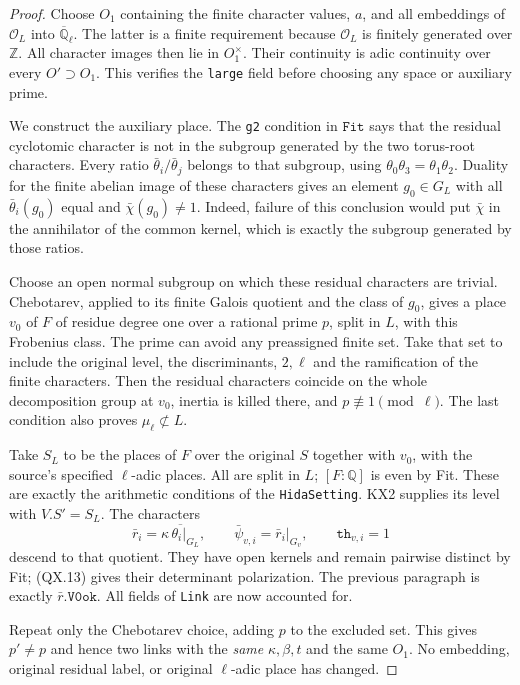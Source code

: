 \begin{proof}
Choose $O_1$ containing the finite character values, $a$, and
all embeddings of $\mathcal O_L$ into
$\overline{\mathbb Q}_\ell$.  The latter is a finite requirement
because $\mathcal O_L$ is finitely generated over $\mathbb Z$.
All character images then lie in $O_1^\times$.  Their
continuity is adic continuity over every $O'\supset O_1$.
This verifies the \texttt{large} field before choosing any
space or auxiliary prime.

We construct the auxiliary place.  The \texttt{g2} condition
in $\texttt{Fit}$ says that the residual cyclotomic character
is not in the subgroup generated by the two torus-root
characters.  Every ratio $\bar\theta_i/\bar\theta_j$ belongs
to that subgroup, using
$\theta_0\theta_3=\theta_1\theta_2$.
Duality for the finite abelian image of these characters gives
an element $g_0\in G_L$ with all $\bar\theta_i(g_0)$ equal
and $\bar\chi(g_0)\ne1$.  Indeed, failure of this conclusion
would put $\bar\chi$ in the annihilator of the common kernel,
which is exactly the subgroup generated by those ratios.

Choose an open normal subgroup on which these residual
characters are trivial.  Chebotarev, applied to its finite
Galois quotient and the class of $g_0$, gives a place $v_0$
of $F$ of residue degree one over a rational prime $p$,
split in $L$, with this Frobenius class.  The prime can avoid
any preassigned finite set.  Take that set to include the
original level, the discriminants, $2,\ell$ and the
ramification of the finite characters.  Then the residual
characters coincide on the whole decomposition group at
$v_0$, inertia is killed there, and $p\not\equiv1\pmod\ell$.
The last condition also proves $\mu_\ell\not\subset L$.

Take $S_L$ to be the places of $F$ over the original $S$
together with $v_0$, with the source's specified
$\ell$-adic places.  All are split in $L$; $[F:\mathbb Q]$
is even by Fit.  These are exactly the arithmetic conditions
of the \texttt{HidaSetting}.  KX2 supplies its level with
$V.S'=S_L$.  The characters
\[
 \bar r_i=\overline{\kappa\,\theta_i|_{G_L}},
 \qquad \bar\psi_{v,i}=\bar r_i|_{G_v},\qquad
                        \texttt{th}_{v,i}=1
 \tag{QX.14}
\]
descend to that quotient.  They have open kernels and remain
pairwise distinct by Fit; (QX.13) gives their determinant
polarization.  The previous paragraph is exactly
$\bar r.\texttt{V0ok}$.  All fields of \texttt{Link} are now
accounted for.

Repeat only the Chebotarev choice, adding $p$ to the excluded
set.  This gives $p'\ne p$ and hence two links with the
\emph{same} $\kappa,\beta,t$ and the same $O_1$.
No embedding, original residual label, or original
$\ell$-adic place has changed.
\end{proof}


